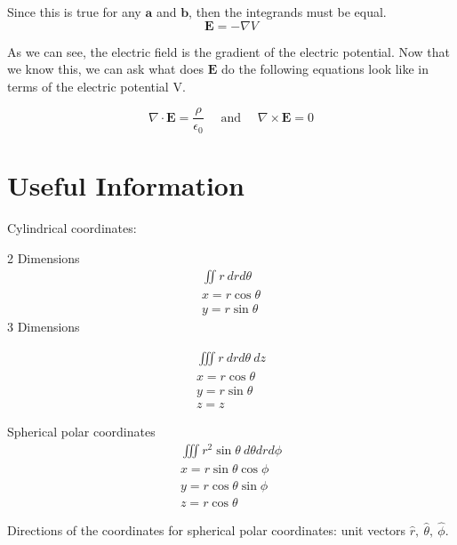 Since this is true for any \( \mathbf{a} \) and \( \mathbf{b} \), then the integrands must be equal.
\begin{equation}
\boxed{\mathbf{E} = -\nabla V}
\end{equation}

As we can see, the electric field is the gradient of the electric potential. Now that we know this, we can ask what does \( \mathbf{E} \) do the following equations look like in terms of the electric potential V. 

\begin{equation}
\nabla \cdot \mathbf{E}=\frac{\rho}{\epsilon_{0}} \quad \text { and } \quad \nabla \times \mathbf{E}=0
\end{equation} 
\newpage


\section{Useful Information}
Cylindrical coordinates:

2 Dimensions
\begin{equation}
\begin{split}
\iint r\ dr d\theta \\
x=r\cos{\theta} \\
y=r\sin{\theta}
\end{split}
\end{equation}
3 Dimensions

\begin{equation}
\begin{split}
\iiint r\ dr d\theta\ dz \\
x=r\cos{\theta} \\
y=r\sin{\theta} \\
z=z
\end{split}
\end{equation}


Spherical polar coordinates
\begin{equation}
\begin{split}
\iiint r^2\sin{\theta}\ d\theta dr d\phi \\
x=r\sin{\theta}\cos{\phi} \\
y=r\cos{\theta}\sin{\phi} \\
z=r\cos{\theta}
\end{split}
\end{equation}

Directions of the coordinates for spherical polar coordinates: unit vectors \(  \hat{r},\ \hat{\theta},\ \hat{\phi} \).

